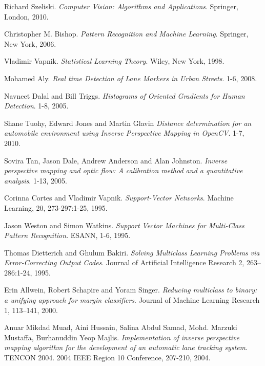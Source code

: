 \begin{thebibliography}{9}
	Richard Szeliski. 
	\textit{Computer Vision: Algorithms and Applications}. 
	Springer, London, 2010.
	
	Christopher M. Bishop. 
	\textit{Pattern Recognition and Machine Learning}. 
	Springer, New York, 2006.
	
	Vladimir Vapnik. 
	\textit{Statistical Learning Theory}. 
	Wiley, New York, 1998.
	
	Mohamed Aly.
	\textit{Real time Detection of Lane Markers in Urban Streets}.
	1-6, 2008.
		
	Navneet Dalal and Bill Triggs. 
	\textit{Histograms of Oriented Gradients for Human Detection}.
	1-8, 2005.
	
	Shane Tuohy, Edward Jones and Martin Glavin
	\textit{Distance determination for an automobile environment using Inverse Perspective Mapping in OpenCV}.
	1-7, 2010.

	Sovira Tan, Jason Dale, Andrew Anderson and Alan Johnston.
	\textit{Inverse perspective mapping and optic flow: A calibration method and a quantitative analysis}.
	1-13, 2005.
	
	Corinna Cortes and Vladimir Vapnik.
	\textit{Support-Vector Networks}.
	Machine Learning, 20, 273-297:1-25, 1995.
	
	Jason Weston and Simon Watkins.
	\textit{Support Vector Machines for Multi-Class Pattern Recognition}.
	ESANN, 1-6, 1995.
	
	Thomas Dietterich and Ghulum Bakiri.
	\textit{Solving Multiclass Learning Problems via Error-Correcting Output Codes}.
	Journal of Artificial Intelligence Research 2, 263–286:1-24, 1995.
	
	Erin Allwein, Robert Schapire and Yoram Singer.
	\textit{Reducing multiclass to binary: a unifying approach for margin classifiers}.
	Journal of Machine Learning Research 1, 113–141, 2000.
	
	Anuar Mikdad Muad, Aini Hussain, Salina Abdul Samad, Mohd. Marzuki Mustaffa, Burhanuddin Yeop Majlis.
	\textit{Implementation of inverse perspective mapping algorithm for the development of an automatic lane tracking system}.
	TENCON 2004. 2004 IEEE Region 10 Conference, 207-210, 2004.
	

\end{thebibliography}
